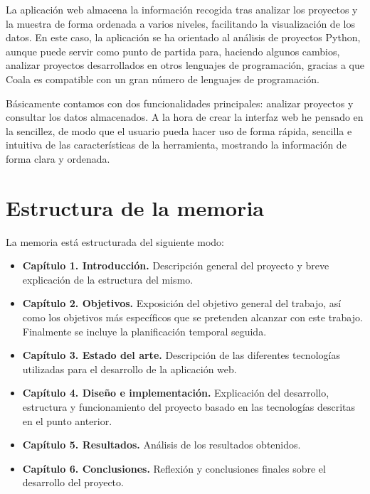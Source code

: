\documentclass[a4paper, 12pt]{book}
\begin{document}
La aplicación web almacena la información recogida tras analizar los proyectos y la muestra de forma ordenada a varios niveles, facilitando la visualización de los datos. En este caso, la aplicación se ha orientado al análisis de proyectos Python, aunque puede servir como punto de partida para, haciendo algunos cambios, analizar proyectos desarrollados en otros lenguajes de programación, gracias a que Coala es compatible con un gran número de lenguajes de programación.

Básicamente contamos con dos funcionalidades principales: analizar proyectos y consultar los datos almacenados. A la hora de crear la interfaz web he pensado en la sencillez, de modo que el usuario pueda hacer uso de forma rápida, sencilla e intuitiva de las características de la herramienta, mostrando la información de forma clara y ordenada.

\section{Estructura de la memoria}
\label{sec:estructura}

La memoria está estructurada del siguiente modo:

\begin{itemize}
  \item \textbf{Capítulo 1. Introducción.} Descripción general del proyecto y breve explicación de la estructura del mismo.
  
  \item \textbf{Capítulo 2. Objetivos.} Exposición del objetivo general del trabajo, así como los objetivos más específicos que se pretenden alcanzar con este trabajo. Finalmente se incluye la planificación temporal seguida.
  
  \item \textbf{Capítulo 3. Estado del arte.} Descripción de las diferentes tecnologías utilizadas para el desarrollo de la aplicación web.
  
  \item \textbf{Capítulo 4. Diseño e implementación.} Explicación del desarrollo, estructura y funcionamiento del proyecto basado en las tecnologías descritas en el punto anterior.

  \item \textbf{Capítulo 5. Resultados.} Análisis de los resultados obtenidos.

  \item \textbf{Capítulo 6. Conclusiones.} Reflexión y conclusiones finales sobre el desarrollo del proyecto.
\end{itemize}
\end{document}
